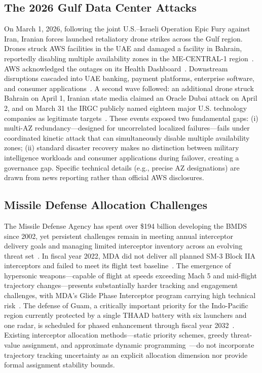 \documentclass[runningheads]{llncs}
\begin{document}
\subsection{The 2026 Gulf Data Center Attacks}

On March 1, 2026, following the joint U.S.--Israeli Operation Epic Fury against Iran, Iranian forces launched retaliatory drone strikes across the Gulf region. Drones struck AWS facilities in the UAE and damaged a facility in Bahrain, reportedly disabling multiple availability zones in the ME-CENTRAL-1 region~\cite{cnbc1,register1}. AWS acknowledged the outages on its Health Dashboard~\cite{register1}. Downstream disruptions cascaded into UAE banking, payment platforms, enterprise software, and consumer applications~\cite{cnbc2}. A second wave followed: an additional drone struck Bahrain on April 1, Iranian state media claimed an Oracle Dubai attack on April 2, and on March 31 the IRGC publicly named eighteen major U.S. technology companies as legitimate targets~\cite{conversation}. These events exposed two fundamental gaps: (i) multi-AZ redundancy---designed for uncorrelated localized failures---fails under coordinated kinetic attack that can simultaneously disable multiple availability zones; (ii) standard disaster recovery makes no distinction between military intelligence workloads and consumer applications during failover, creating a governance gap. Specific technical details (e.g., precise AZ designations) are drawn from news reporting rather than official AWS disclosures.

\subsection{Missile Defense Allocation Challenges}

The Missile Defense Agency has spent over \$194 billion developing the BMDS since 2002, yet persistent challenges remain in meeting annual interceptor delivery goals and managing limited interceptor inventory across an evolving threat set~\cite{gao_md1}. In fiscal year 2022, MDA did not deliver all planned SM-3 Block IIA interceptors and failed to meet its flight test baseline~\cite{gao_md1}. The emergence of hypersonic weapons---capable of flight at speeds exceeding Mach 5 and mid-flight trajectory changes---presents substantially harder tracking and engagement challenges, with MDA's Glide Phase Interceptor program carrying high technical risk~\cite{gao_md2}. The defense of Guam, a critically important priority for the Indo-Pacific region currently protected by a single THAAD battery with six launchers and one radar, is scheduled for phased enhancement through fiscal year 2032~\cite{gao_md3}. Existing interceptor allocation methods---static priority schemes, greedy threat-value assignment, and approximate dynamic programming~\cite{davis_adp,summers_adp}---do not incorporate trajectory tracking uncertainty as an explicit allocation dimension nor provide formal assignment stability bounds.
\end{document}
